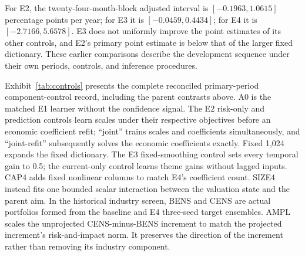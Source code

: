 \documentclass[12pt,letterpaper,fleqn]{article}
\begin{document}
For E2, the twenty-four-month-block adjusted interval is $[-0.1963,1.0615]$ percentage points per year; for E3 it is $[-0.0459,0.4434]$; for E4 it is $[-2.7166,5.6578]$. E3 does not uniformly improve the point estimates of its other controls, and E2's primary point estimate is below that of the larger fixed dictionary. These earlier comparisons describe the development sequence under their own periods, controls, and inference procedures.

Exhibit~\ref{tab:controls} presents the complete reconciled primary-period component-control record, including the parent contrasts above. A0 is the matched E1 learner without the confidence signal. The E2 risk-only and prediction controls learn scales under their respective objectives before an economic coefficient refit; ``joint'' trains scales and coefficients simultaneously, and ``joint-refit'' subsequently solves the economic coefficients exactly. Fixed 1,024 expands the fixed dictionary. The E3 fixed-smoothing control sets every temporal gain to 0.5; the current-only control learns theme gains without lagged inputs. CAP4 adds fixed nonlinear columns to match E4's coefficient count. SIZE4 instead fits one bounded scalar interaction between the valuation state and the parent aim. In the historical industry screen, BENS and CENS are actual portfolios formed from the baseline and E4 three-seed target ensembles. AMPL scales the unprojected CENS-minus-BENS increment to match the projected increment's risk-and-impact norm. It preserves the direction of the increment rather than removing its industry component.
\end{document}
